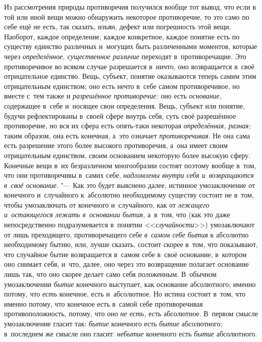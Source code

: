Из рассмотрения природы противоречия получился вообще тот вывод, что если в
той или иной вещи можно обнаружить некоторое противоречие, то это само по
себе ещё не есть, так сказать, изъян, дефект или погрешность этой вещи.
Наоборот, каждое определение, каждое конкретное, каждое понятие есть по
существу единство различных и~могущих быть различенными моментов, которые
через {\em определённое, существенное различие}
переходят в~противоречащие. Это противоречивое во всяком случае разрешается
в~ничто, оно возвращается в~своё отрицательное единство. Вещь, субъект,
понятие оказываются теперь самим этим отрицательным единством; оно есть
нечто в~себе самом противоречивое, но вместе с~тем также и
{\em разрешённое противоречие:} оно есть
{\em основание,} содержащее в~себе и~носящее свои
определения. Вещь, субъект или понятие, будучи рефлектированы в~своей сфере
внутрь себя, суть своё разрешённое противоречие, но вся их сфера есть
опять-таки некоторая {\em определённая, разная;} таким
образом, она есть конечная, а~это означает
{\em противоречивая}. Не она сама есть разрешение этого
более высокого противоречия, а~она имеет своим отрицательным единством,
своим основанием некоторую более высокую сферу. Конечные вещи в~их
безразличном многообразии состоят поэтому вообще в~том, что они
противоречивы в~самих себе, {\em надломлены внутри себя
и~возвращаются в~своё основание}. "--- Как это будет выяснено далее, истинное
умозаключение от конечного и~случайного к~абсолютно необходимому существу
состоит не в~том, чтобы умозаключать от конечного и~случайного, как от
{\em лежащего и~остающегося лежать в~основании бытия,}
а~в~том, что (как это даже непосредственно подразумевается в~понятии
<<{\em случайности}>>) умозаключают от лишь преходящего,
противоречащего себе {\em в~самом себе бытия} к
абсолютно необходимому бытию, или, лучше сказать, состоит скорее в~том, что
показывают, что случайное бытие возвращается в~самом себе в~своё основание,
в~котором оно снимает себя, и~что, далее, оно через это возвращение
полагает основание лишь так, что оно скорее делает само себя положенным.
В~обычном умозаключении {\em бытие} конечного выступает,
как основание абсолютного; именно потому, что
{\em есть} конечное, есть и~абсолютное. Но истина
состоит в~том, что именно потому, что конечное есть в~самой себе
противоречивая противоположность, потому, что оно
{\em не есть,} есть абсолютное. В~первом смысле
умозаключение гласит так: {\em бытие} конечного есть
{\em бытие} абсолютного; в~последнем же смысле оно
гласит: {\em небытие} конечного есть {\em бытие} абсолютного.
